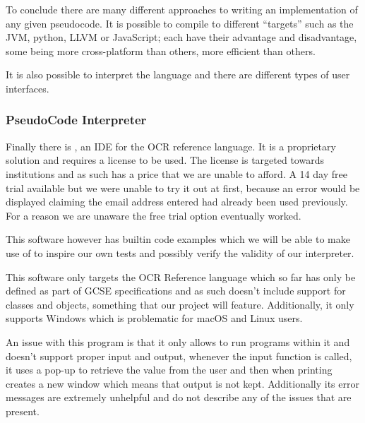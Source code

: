 \documentclass{article}
\begin{document}
To conclude there are many different approaches to writing an implementation of
any given pseudocode. It is possible to compile to different ``targets'' such
as the JVM, python, LLVM or JavaScript; each have their advantage and
disadvantage, some being more cross-platform than others, more efficient than
others.

It is also possible to interpret the language and there are different types of
user interfaces.

\subsubsection{PseudoCode Interpreter}

Finally there is , an IDE for the OCR reference
language. It is a proprietary solution and requires a license to be used. The
license is targeted towards institutions and as such has a price that we are
unable to afford. A 14 day free trial available but we were unable to try it
out at first, because an error would be displayed claiming the email address
entered had already been used previously. For a reason we are unaware the free
trial option eventually worked.

This software however has builtin code examples which we will be able to make
use of to inspire our own tests and possibly verify the validity of our
interpreter.

This software only targets the OCR Reference language which so far has only be
defined as part of GCSE specifications and as such doesn't include support for
classes and objects, something that our project will feature. Additionally, it
only supports Windows which is problematic for macOS and Linux users.

An issue with this program is that it only allows to run programs within it and
doesn't support proper input and output, whenever the input function is called,
it uses a pop-up to retrieve the value from the user and then when printing
creates a new window which means that output is not kept. Additionally its
error messages are extremely unhelpful and do not describe any of the issues
that are present.
\end{document}
